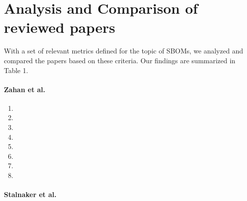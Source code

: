 \section{Analysis and Comparison of reviewed papers} \label{analysis}

\noindent With a set of relevant metrics defined for the topic of SBOMs, we analyzed and compared the papers based on these criteria. Our findings are summarized in Table 1.

\paragraph{Zahan et al. \cite{article:sbom-required}}

\begin{enumerate}
    \item
    \item
    \item
    \item
    \item
    \item
    \item
    \item
\end{enumerate}

\paragraph{Stalnaker et al. \cite{article:software-bom}}

